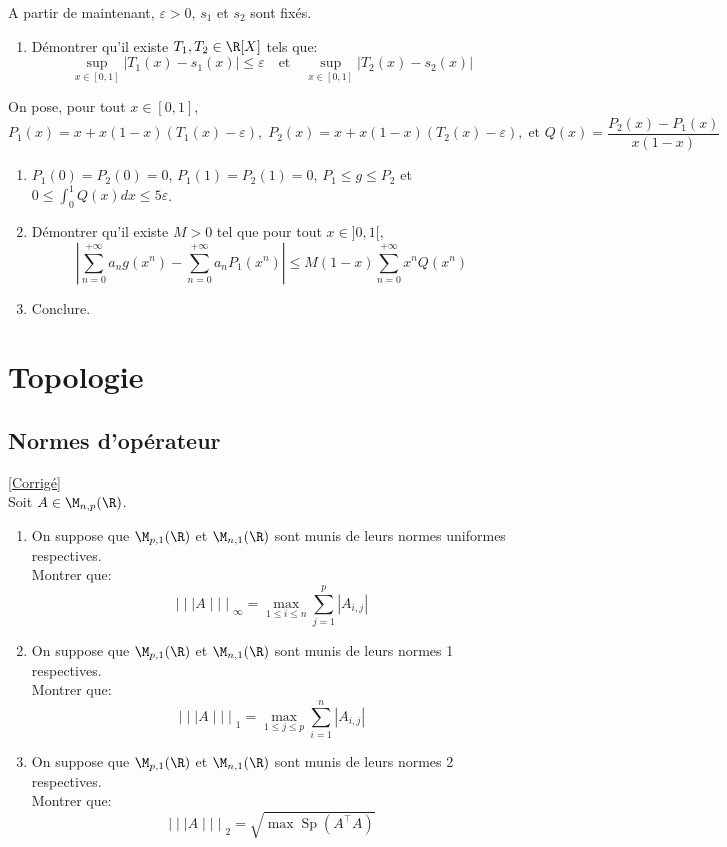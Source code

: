 \documentclass{book}
\begin{document}
A partir de maintenant, $\varepsilon>0$, $s_1$ et $s_2$ sont fixés.
\begin{enumerate}[resume]
	\item Démontrer qu'il existe $T_1,T_2\in\R[X]$ tels que:
	$$\sup_{x\in[0,1]}|T_1(x)-s_1(x)|\leq \varepsilon \quad \text{et}\quad \sup_{x\in[0,1]}|T_2(x)-s_2(x)|$$
\end{enumerate}
On pose, pour tout $x\in[0,1]$,
$$P_1(x)=x+x(1-x)(T_1(x)-\varepsilon) ,\; P_2(x)=x+x(1-x)(T_2(x)-\varepsilon),\; \text{et }Q(x)=\displaystyle\frac{P_2(x)-P_1(x)}{x(1-x)}$$
\begin{enumerate}[resume]
	\item $P_1(0)=P_2(0)=0$, $P_1(1)=P_2(1)=0$, $P_1\leq g\leq P_2$ et $0\leq\displaystyle\int_0^1Q(x)dx\leq5\varepsilon$.
	\item Démontrer qu'il existe $M>0$ tel que pour tout $x\in]0,1[$, $$\left| \sum_{n=0}^{+\infty}a_ng(x^n)-\sum_{n=0}^{+\infty}a_nP_1(x^n)\right|\leq M(1-x)\sum_{n=0}^{+\infty}x^nQ(x^n)$$
	\item Conclure.
\end{enumerate}


\chapter{Topologie}
\section{Normes d'opérateur }
\textcolor{blue}{\hyperref[sec:normes-doperateur]{[Corrigé]}}\\
\label{Normes d'opérateur}
Soit $A\in\M_{n,p}(\R)$.
\begin{enumerate}[leftmargin=*]
	\item On suppose que $\M_{p,1}(\R)$ et $\M_{n,1}(\R)$ sont munis de leurs normes uniformes respectives. \\Montrer que: $${\mid\mid\mid A\mid\mid\mid}_\infty=\max\limits_{1\leq i \leq n} \sum\limits_{j=1}^p |A_{i,j}|$$
	\item On suppose que $\M_{p,1}(\R)$ et $\M_{n,1}(\R)$ sont munis de leurs normes 1 respectives. \\Montrer que: $${\mid\mid\mid A\mid\mid\mid}_1=\max\limits_{1\leq j \leq p} \sum\limits_{i=1}^n |A_{i,j}|$$
	\item On suppose que $\M_{p,1}(\R)$ et $\M_{n,1}(\R)$ sont munis de leurs normes 2 respectives. \\Montrer que:$${\mid\mid\mid A\mid\mid\mid}_2=\sqrt{\max \operatorname{Sp}(A^\top A)}$$
\end{enumerate}
\end{document}
